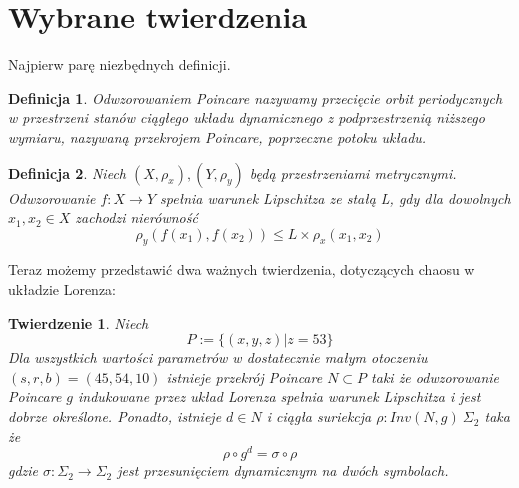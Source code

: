 \documentclass[12pt]{report}
\newtheorem{theorem}{Twierdzenie}
\newtheorem{definition}{Definicja}
\begin{document}
	\section{Wybrane twierdzenia}
	Najpierw parę niezbędnych definicji.
	\begin{definition}
		Odwzorowaniem Poincare nazywamy przecięcie orbit periodycznych w przestrzeni stanów ciągłego układu dynamicznego z podprzestrzenią niższego wymiaru, nazywaną przekrojem Poincare, poprzeczne potoku układu.
	\end{definition}
	\begin{definition}
		Niech $(X, \rho_x), (Y, \rho_y)$ będą przestrzeniami metrycznymi. Odwzorowanie $f: X \to Y$ spełnia warunek Lipschitza ze stałą L, gdy dla dowolnych $x_1, x_2 \in X$ zachodzi nierówność
			\[ \rho_y(f(x_1), f(x_2)) \le L \times \rho_x(x_1, x_2) \]
	\end{definition}
	Teraz możemy przedstawić dwa ważnych twierdzenia, dotyczących chaosu w układzie Lorenza:
	\begin{theorem}
		Niech
			\[ P := \{(x, y, z) | z = 53\} \]
		Dla wszystkich wartości parametrów w dostatecznie małym otoczeniu $(s, r, b) = (45, 54, 10)$ istnieje przekrój Poincare $N \subset P$ taki że odwzorowanie Poincare $g$ indukowane przez układ Lorenza spełnia warunek Lipschitza i jest dobrze określone. Ponadto, istnieje $d \in N$ i ciągła suriekcja $\rho : Inv(N, g) \ \Sigma_2$ taka że
			\[ \rho \circ g^d = \sigma \circ \rho \]
		gdzie $\sigma : \Sigma_2 \to \Sigma_2$ jest przesunięciem dynamicznym na dwóch symbolach. \cite{MM}
	\end{theorem}
\end{document}
